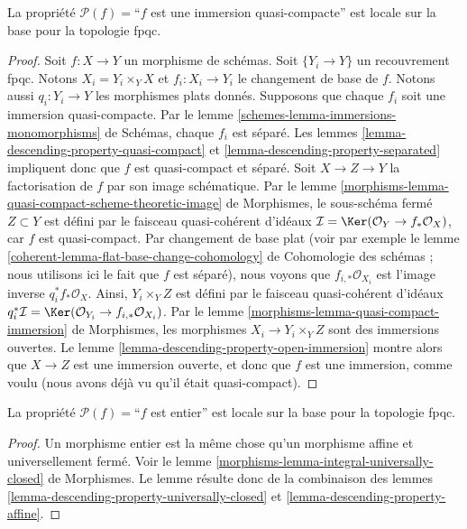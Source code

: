 \begin{lemma}
\label{lemma-descending-property-quasi-compact-immersion}
La propriété $\mathcal{P}(f) =$``$f$ est une immersion quasi-compacte''
est locale sur la base pour la topologie fpqc.
\end{lemma}

\begin{proof}
Soit $f : X \to Y$ un morphisme de schémas.
Soit $\{Y_i \to Y\}$ un recouvrement fpqc.
Notons $X_i = Y_i \times_Y X$ et $f_i : X_i \to Y_i$
le changement de base de $f$. Notons aussi
$q_i : Y_i \to Y$ les morphismes plats donnés.
Supposons que chaque $f_i$ soit une immersion quasi-compacte.
Par le lemme \ref{schemes-lemma-immersions-monomorphisms} de Schémas,
chaque $f_i$ est séparé.
Les lemmes \ref{lemma-descending-property-quasi-compact} et
\ref{lemma-descending-property-separated}
impliquent donc que $f$ est quasi-compact et séparé.
Soit $X \to Z \to Y$ la factorisation de $f$ par son
image schématique. Par le
lemme \ref{morphisms-lemma-quasi-compact-scheme-theoretic-image} de Morphismes,
le sous-schéma fermé $Z \subset Y$ est défini par le
faisceau quasi-cohérent d'idéaux
$\mathcal{I} = \Ker(\mathcal{O}_Y \to f_*\mathcal{O}_X)$,
car $f$ est quasi-compact. Par changement de base plat
(voir par exemple le lemme
\ref{coherent-lemma-flat-base-change-cohomology} de Cohomologie des schémas ;
nous utilisons ici le fait que $f$ est séparé),
nous voyons que $f_{i, *}\mathcal{O}_{X_i}$ est l'image inverse
$q_i^*f_*\mathcal{O}_X$.
Ainsi, $Y_i \times_Y Z$ est défini par le
faisceau quasi-cohérent d'idéaux $q_i^*\mathcal{I} =
\Ker(\mathcal{O}_{Y_i} \to f_{i, *}\mathcal{O}_{X_i})$.
Par le lemme \ref{morphisms-lemma-quasi-compact-immersion} de Morphismes,
les morphismes $X_i \to Y_i \times_Y Z$
sont des immersions ouvertes. Le
lemme \ref{lemma-descending-property-open-immersion}
montre alors que $X \to Z$ est une immersion ouverte, et donc que
$f$ est une immersion, comme voulu
(nous avons déjà vu qu'il était quasi-compact).
\end{proof}

\begin{lemma}
\label{lemma-descending-property-integral}
La propriété $\mathcal{P}(f) =$``$f$ est entier''
est locale sur la base pour la topologie fpqc.
\end{lemma}

\begin{proof}
Un morphisme entier est la même chose qu'un morphisme affine et
universellement fermé. Voir
le lemme \ref{morphisms-lemma-integral-universally-closed} de Morphismes.
Le lemme résulte donc de la combinaison des
lemmes \ref{lemma-descending-property-universally-closed}
et \ref{lemma-descending-property-affine}.
\end{proof}

